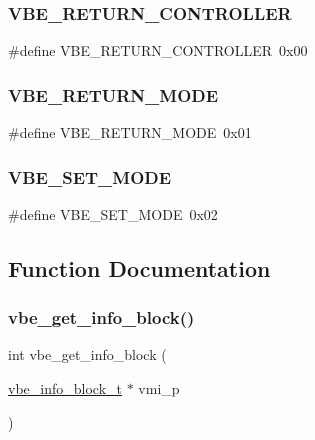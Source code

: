 \subsubsection{\texorpdfstring{V\+B\+E\+\_\+\+R\+E\+T\+U\+R\+N\+\_\+\+C\+O\+N\+T\+R\+O\+L\+L\+ER}{VBE\_RETURN\_CONTROLLER}}
{\footnotesize\ttfamily \#define V\+B\+E\+\_\+\+R\+E\+T\+U\+R\+N\+\_\+\+C\+O\+N\+T\+R\+O\+L\+L\+ER~0x00}

\hypertarget{group__vbe_gab9d80b9e6d7846ea3fa090c817771866}{}\label{group__vbe_gab9d80b9e6d7846ea3fa090c817771866} 
\subsubsection{\texorpdfstring{V\+B\+E\+\_\+\+R\+E\+T\+U\+R\+N\+\_\+\+M\+O\+DE}{VBE\_RETURN\_MODE}}
{\footnotesize\ttfamily \#define V\+B\+E\+\_\+\+R\+E\+T\+U\+R\+N\+\_\+\+M\+O\+DE~0x01}

\hypertarget{group__vbe_ga02477c4996ff058aee590b54f2146eb5}{}\label{group__vbe_ga02477c4996ff058aee590b54f2146eb5} 
\subsubsection{\texorpdfstring{V\+B\+E\+\_\+\+S\+E\+T\+\_\+\+M\+O\+DE}{VBE\_SET\_MODE}}
{\footnotesize\ttfamily \#define V\+B\+E\+\_\+\+S\+E\+T\+\_\+\+M\+O\+DE~0x02}



\subsection{Function Documentation}
\hypertarget{group__vbe_ga4e9da75c9063842b969ad400e5700c0c}{}\label{group__vbe_ga4e9da75c9063842b969ad400e5700c0c} 
\subsubsection{\texorpdfstring{vbe\+\_\+get\+\_\+info\+\_\+block()}{vbe\_get\_info\_block()}}
{\footnotesize\ttfamily int vbe\+\_\+get\+\_\+info\+\_\+block (\begin{DoxyParamCaption}\item[{\hyperlink{structvbe__info__block__t}{vbe\+\_\+info\+\_\+block\+\_\+t} $\ast$}]{vmi\+\_\+p }\end{DoxyParamCaption})}



